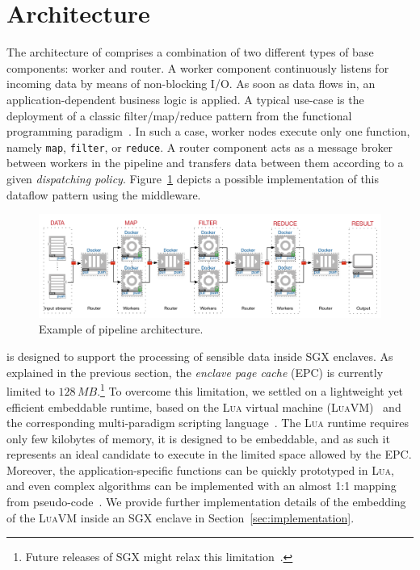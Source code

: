 \section{Architecture}\label{sec:architecture}

The architecture of \SYS{} comprises a combination of two different types of base components: \textsf{worker} and \textsf{router}.
A \textsf{worker} component continuously listens for incoming data by means of non-blocking I/O.
As soon as data flows in, an application-dependent business logic is applied.
A typical use-case is the deployment of a classic filter/map/reduce pattern from the functional programming paradigm~\cite{bird_introduction_1988}.
In such a case, worker nodes execute only one function, namely \texttt{map}, \texttt{filter}, or \texttt{reduce}.
A \textsf{router} component acts as a message broker between workers in the pipeline and transfers data between them according to a given \emph{dispatching policy}.
Figure~\ref{fig:architecture_pipeline} depicts a possible implementation of this dataflow pattern using the \SYS{} middleware.

\begin{figure}[!t]
  \centering
  \includegraphics[width=\linewidth]{images/architecture_pipeline}
  \caption{Example of \SYS{} pipeline architecture.}
  \label{fig:architecture_pipeline}
\end{figure}


\SYS{} is designed to support the processing of sensible data inside SGX enclaves.
As explained in the previous section, the \emph{enclave page cache} (EPC) is currently limited to $128\,MB$.\footnote{Future releases of SGX might relax this limitation~\cite{mckeen2016intel}.}
To overcome this limitation, we settled on a lightweight yet efficient embeddable runtime, based on the \textsc{Lua} virtual machine (\textsc{LuaVM})~\cite{ierusalimschy_luaextensible_1996} and the corresponding multi-paradigm scripting language~\cite{lualang}.
The \textsc{Lua} runtime requires only few kilobytes of memory, it is designed to be embeddable, and as such it represents an ideal candidate to execute in the limited space allowed by the EPC.
Moreover, the application-specific functions can be quickly prototyped in \textsc{Lua}, and even complex algorithms can be implemented with an almost 1:1 mapping from pseudo-code~\cite{leonini2009splay}.
We provide further implementation details of the embedding of the \textsc{LuaVM} inside an SGX enclave in Section~\ref{sec:implementation}.

